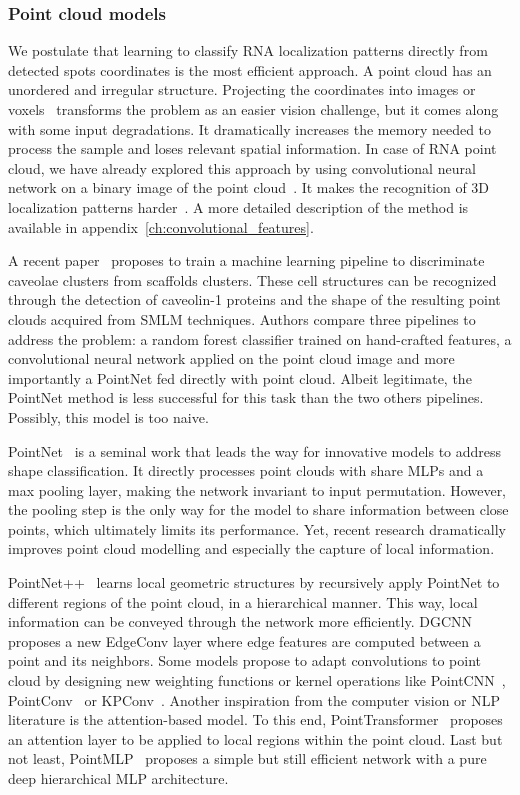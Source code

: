 \subsubsection{Point cloud models}

We postulate that learning to classify RNA localization patterns directly from detected spots coordinates is the most efficient approach.
A point cloud has an unordered and irregular structure.
Projecting the coordinates into images or voxels~\cite{Maturana_2015} transforms the problem as an easier vision challenge, but it comes along with some input degradations.
It dramatically increases the memory needed to process the sample and loses relevant spatial information.
In case of \ac{RNA} point cloud, we have already explored this approach by using convolutional neural network on a binary image of the point cloud~\cite{dubois_deep_2019}.
It makes the recognition of 3D localization patterns harder~\cite{dubois_deep_2019}.
A more detailed description of the method is available in appendix~\ref{ch:convolutional_features}.

A recent paper~\cite{khater_caveolae_2019} proposes to train a machine learning pipeline to discriminate caveolae clusters from scaffolds clusters.
These cell structures can be recognized through the detection of caveolin-1 proteins and the shape of the resulting point clouds acquired from \ac{SMLM} techniques.
Authors compare three pipelines to address the problem: a random forest classifier trained on hand-crafted features, a convolutional neural network applied on the point cloud image and more importantly a PointNet fed directly with point cloud.
Albeit legitimate, the PointNet method is less successful for this task than the two others pipelines.
Possibly, this model is too naive.

PointNet~\cite{Qi_2017_CVPR} is a seminal work that leads the way for innovative models to address shape classification.
It directly processes point clouds with share MLPs and a max pooling layer, making the network invariant to input permutation.
However, the pooling step is the only way for the model to share information between close points, which ultimately limits its performance.
Yet, recent research dramatically improves point cloud modelling and especially the capture of local information.

PointNet++~\cite{Qi_2017} learns local geometric structures by recursively apply PointNet to different regions of the point cloud, in a hierarchical manner.
This way, local information can be conveyed through the network more efficiently.
DGCNN~\cite{Wang_2019} proposes a new EdgeConv layer where edge features are computed between a point and its neighbors.
Some models propose to adapt convolutions to point cloud by designing new weighting functions or kernel operations like PointCNN~\cite{Li_2018}, PointConv~\cite{Wu_2019_CVPR} or KPConv~\cite{Thomas_2019_ICCV}.
Another inspiration from the computer vision or NLP literature is the attention-based model.
To this end, PointTransformer~\cite{Zhao_2021_ICCV} proposes an attention layer to be applied to local regions within the point cloud.
Last but not least, PointMLP~\cite{ma2022rethinking} proposes a simple but still efficient network with a pure deep hierarchical MLP architecture.

